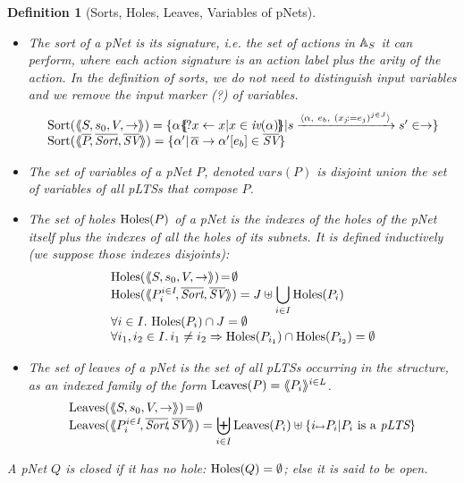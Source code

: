 \documentclass{lmcs}
\newtheorem{definition}{Definition}
\begin{document}
\begin{definition}[Sorts, Holes, Leaves, Variables of pNets]\label{def-sortholeleave}~~

  \begin{itemize}
  \item The sort of a pNet is its signature, i.e. the set of actions in $\mathbb{A}_S$ it can
perform, where each action signature is an action 
label plus the arity of the action. In the definition of sorts, we do not need to 
distinguish
input variables and we remove the
\emph{input marker} (?) of variables.
\[
\begin{array}{l}
\Sortop(\mylangle S,s_0,V, \to\myrangle) = \{\alpha\subst{?x \gets x| 
x\in\symb{iv}(\alpha)}|s \xrightarrow{\langle \alpha,~e_b,~(x_j\!:= {e}_j)^{j\in
    J}\rangle} s'\in \to \} \\
\Sortop(\mylangle \set{\pNet}\!, %
\set{\Sort},
\set{\symb{SV}}\myrangle)
=\{\alpha' |\, \SV{\set{\alpha}}{\alpha'}{e_b}\in\set{\symb{SV}}\}
\end{array}
\]

\item The set of variables of a pNet $P$, denoted $vars(P)$ is disjoint union the set of variables of  all pLTSs that compose $P$.

\item
The set of holes $\operatorname{Holes}(P)$ of a pNet is the indexes of the holes of the pNet 
itself plus the indexes of all the holes of its subnets.
It is defined inductively (we suppose those indexes 
disjoints):
  \[\begin{array}{l}
\Holes(\mylangle S,s_0,V, \to\myrangle) \!=\! \emptyset\\
\Holes(\mylangle \pNet_i^{i\in I}\!,\set{\Sort}, \set{\symb{SV}}\myrangle) 
=J\uplus{\displaystyle \bigcup_{i\in 
I}\Holes(\pNet_i)}\\
\forall i\in I.\, \Holes(\pNet_i)\cap J=\emptyset\\
\forall i_1,i_2\in I.\,i_1\neq i_2\Rightarrow  \Holes(\pNet_{i_1})\cap\Holes(\pNet_{i_2})=\emptyset
\end{array}\]
\item
The set of leaves of a pNet is the set of all pLTSs occurring in the structure, as an 
indexed family of the form $\operatorname{Leaves}(P)= \langle\hspace{-0.58ex}\langle P_i \rangle\hspace{-0.58ex}\rangle^{i \in L}$.
\[\begin{array}{l}
\Leaves(\mylangle S,s_0,V, \to\myrangle) \!=\!\emptyset\\%
\Leaves(\mylangle \pNet_i^{i\in I}\!,%
\set{\Sort}\!, \set{\symb{SV}}\myrangle) = {\displaystyle \biguplus_{i\in 
I}\Leaves(\pNet_i)\uplus\{i\mapsto \pNet_i|\pNet_i \text{ is a }\pLTS\}}
\end{array}\]
\end{itemize}

A pNet $Q$ is \emph{closed} if it has no hole: $\operatorname{Holes}(Q)=\emptyset$; else it
is said to be \emph{open}.
\end{definition}
  
\end{document}
